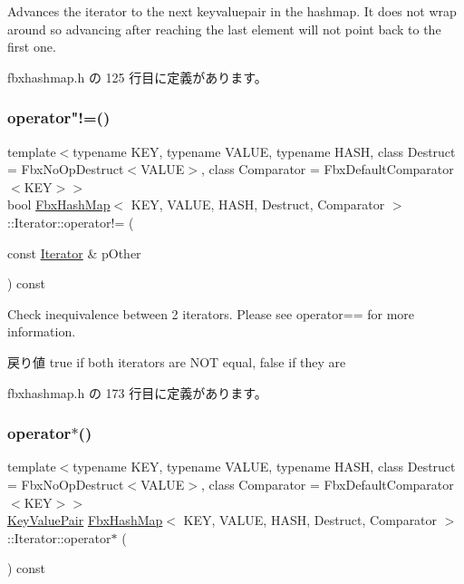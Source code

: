 Advances the iterator to the next keyvaluepair in the hashmap. It does not wrap around so advancing after reaching the last element will not point back to the first one. 

 fbxhashmap.\+h の 125 行目に定義があります。

\mbox{\label{class_fbx_hash_map_1_1_iterator_a092b6ea2a37710015462f1a9ad986741}} 
\subsubsection{\texorpdfstring{operator"!=()}{operator!=()}}
{\footnotesize\ttfamily template$<$typename K\+EY, typename V\+A\+L\+UE, typename H\+A\+SH, class Destruct = Fbx\+No\+Op\+Destruct$<$\+V\+A\+L\+U\+E$>$, class Comparator = Fbx\+Default\+Comparator$<$\+K\+E\+Y$>$$>$ \\
bool \hyperlink{class_fbx_hash_map}{Fbx\+Hash\+Map}$<$ K\+EY, V\+A\+L\+UE, H\+A\+SH, Destruct, Comparator $>$\+::Iterator\+::operator!= (\begin{DoxyParamCaption}\item[{const \hyperlink{class_fbx_hash_map_1_1_iterator}{Iterator} \&}]{p\+Other }\end{DoxyParamCaption}) const\hspace{0.3cm}{\ttfamily [inline]}}

Check inequivalence between 2 iterators. Please see operator== for more information. \begin{DoxyReturn}{戻り値}
true if both iterators are N\+OT equal, false if they are 
\end{DoxyReturn}


 fbxhashmap.\+h の 173 行目に定義があります。

\mbox{\label{class_fbx_hash_map_1_1_iterator_a0ab28ebe60b4c300d3ebf092d80b3ab3}} 
\subsubsection{\texorpdfstring{operator$\ast$()}{operator*()}}
{\footnotesize\ttfamily template$<$typename K\+EY, typename V\+A\+L\+UE, typename H\+A\+SH, class Destruct = Fbx\+No\+Op\+Destruct$<$\+V\+A\+L\+U\+E$>$, class Comparator = Fbx\+Default\+Comparator$<$\+K\+E\+Y$>$$>$ \\
\hyperlink{class_fbx_hash_map_1_1_iterator_a2a68388bbedcb2e86a927259561fc1d4}{Key\+Value\+Pair} \hyperlink{class_fbx_hash_map}{Fbx\+Hash\+Map}$<$ K\+EY, V\+A\+L\+UE, H\+A\+SH, Destruct, Comparator $>$\+::Iterator\+::operator$\ast$ (\begin{DoxyParamCaption}{ }\end{DoxyParamCaption}) const\hspace{0.3cm}{\ttfamily [inline]}}

